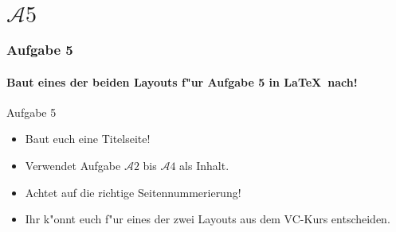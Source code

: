 \section{$\mathcal{A}5$}

\begin{frame}
\frametitle{Aufgabe 5}
\framesubtitle{Baut eines der beiden Layouts f"ur Aufgabe 5 in \LaTeX ~nach!}

\begin{block}{Aufgabe 5}
\begin{itemize}
\item Baut euch eine Titelseite!%
\item Verwendet Aufgabe $\mathcal{A}2$ bis $\mathcal{A}4$ als Inhalt.%
\item Achtet auf die richtige Seitennummerierung!%
\item Ihr k"onnt euch f"ur eines der zwei Layouts aus dem VC-Kurs entscheiden.%
\end{itemize}
\end{block}
\end{frame}
